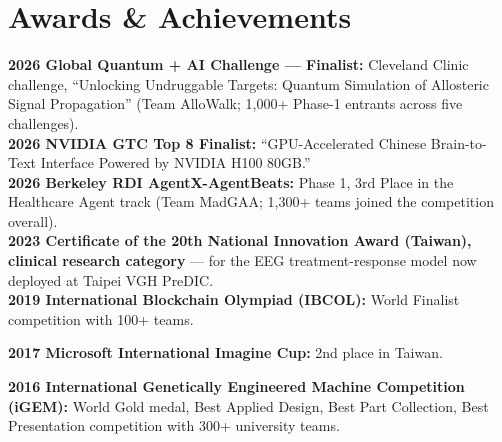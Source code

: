 \documentclass[letterpaper,10pt]{article}
\newcommand{\resumeSubHeadingListStart}{\begin{itemize}[leftmargin=0.15in, label={}]}
\newcommand{\resumeSubHeadingListEnd}{\end{itemize}}
\begin{document}
\section{Awards \& Achievements}
  \vspace{2pt}
  \resumeSubHeadingListStart
    \small{\item{
        \textbf{2026 Global Quantum + AI Challenge --- Finalist:}{ Cleveland Clinic challenge, ``Unlocking Undruggable Targets: Quantum Simulation of Allosteric Signal Propagation'' (Team AlloWalk; 1,000+ Phase-1 entrants across five challenges).} \\ \vspace{1pt}
        \textbf{2026 NVIDIA GTC Top 8 Finalist:}{ ``GPU-Accelerated Chinese Brain-to-Text Interface Powered by NVIDIA H100 80GB.''} \\ \vspace{1pt}
        \textbf{2026 Berkeley RDI AgentX-AgentBeats:}{ Phase 1, 3rd Place in the Healthcare Agent track (Team MadGAA; 1,300+ teams joined the competition overall).} \\ \vspace{1pt}
        \textbf{2023 Certificate of the 20th National Innovation Award (Taiwan), clinical research category}{ --- for the EEG treatment-response model now deployed at Taipei VGH PreDIC.} \\ \vspace{1pt}
         \textbf{2019 International Blockchain Olympiad (IBCOL):}{ World Finalist competition with 100+  teams.} \\ \vspace{1pt}
        
        
        \textbf{2017 Microsoft International Imagine Cup:}{ 2nd place in Taiwan.} \\ \vspace{1pt}
        
        
        \textbf{2016 International Genetically Engineered Machine Competition (iGEM):}{ World Gold medal, Best Applied Design, Best Part Collection, Best Presentation competition with 300+ university teams.}
    }}
  \resumeSubHeadingListEnd
\fi
\end{document}
